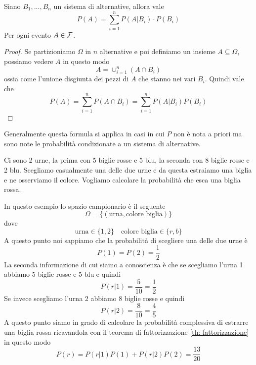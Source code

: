 \begin{theorem}[Fattorizzazione]\label{th: fattorizzazione}
	Siano $B_1, ..., B_n$ un sistema di alternative, allora vale 
	\[ P(A) = \sum_{i=1}^n P(A | B_i) \cdot P(B_i) \]
	Per ogni evento $A \in \mathcal{F}$.
	\begin{proof}
		Se partizioniamo $\Omega$ in $n$ alternative e poi definiamo un insieme
		$A \subseteq \Omega$, possiamo vedere $A$ in questo modo
		\[ A = \cup_{i=1}^n (A \cap B_i) \]
		ossia come l'unione disgiunta dei pezzi di $A$ che stanno nei vari $B_i$. Quindi vale che
		\[ P(A) = \sum_{i=1}^n P(A \cap B_i) = \sum_{i=1}^n P(A | B_i) P(B_i) \]
	\end{proof}
\end{theorem}

Generalmente questa formula si applica in casi in cui $P$ non è nota a priori ma sono note le
probabilità condizionate a un sistema di alternative.

\begin{example}
	Ci sono 2 urne, la prima con 5 biglie rosse e 5 blu, la seconda con 8 biglie rosse e 2 blu.
	Scegliamo casualmente una delle due urne e da questa estraiamo una biglia e ne osserviamo il
	colore. Vogliamo calcolare la probabilità che esca una biglia rossa.

	In questo esempio lo spazio campionario è il seguente 
	\[ \Omega = \{ (\text{urna}, \text{colore biglia}) \} \]
	dove 
	\[ \text{urna} \in \{ 1, 2 \} \quad \text{colore biglia} \in \{ r, b \} \]
	A questo punto noi sappiamo che la probabilità di scegliere una delle due urne è 
	\[ P(1) = P(2) = \frac{1}{2} \]
	La seconda informazione di cui siamo a conoscienza è che se scegliamo l'urna 1 abbiamo 5
	biglie rosse e 5 blu e quindi 
	\[ P(r | 1) = \frac{5}{10} = \frac{1}{2} \]
	Se invece scegliamo l'urna 2 abbiamo 8 biglie rosse e quindi 
	\[ P(r | 2) = \frac{8}{10} = \frac{4}{5} \]
	A questo punto siamo in grado di calcolare la probabilità complessiva di estrarre una biglia
	rossa ricavandola con il teorema di fattorizzazione \ref{th: fattorizzazione} in questo modo
	\[ P(r) = P(r | 1) P(1) + P(r | 2) P(2) = \frac{13}{20} \]
\end{example}
